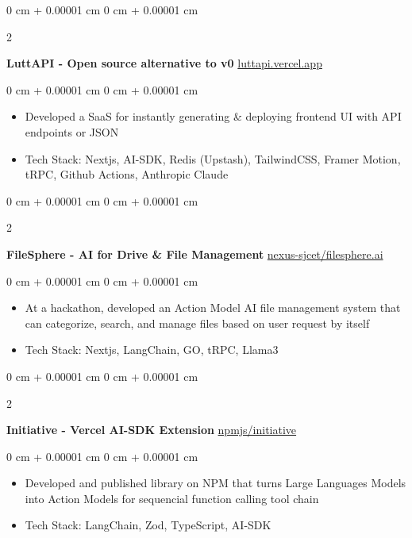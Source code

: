 \documentclass[10pt, letterpaper]{article}
\newenvironment{highlights}{
    \begin{itemize}[
        topsep=0.10 cm,
        parsep=0.10 cm,
        partopsep=0pt,
        itemsep=0pt,
        leftmargin=0 cm + 10pt
    ]
}{
    \end{itemize}
} %
\newenvironment{onecolentry}{
    \begin{adjustwidth}{
        0 cm + 0.00001 cm
    }{
        0 cm + 0.00001 cm
    }
}{
    \end{adjustwidth}
} %
\newenvironment{twocolentry}[2][]{
    \onecolentry
    \def\secondColumn{#2}
    \setcolumnwidth{\fill, 4.5 cm}
    \begin{paracol}{2}
}{
    \switchcolumn \raggedleft \secondColumn
    \end{paracol}
    \endonecolentry
} %
\begin{document}
\vspace{0.2 cm}

\begin{twocolentry}{
		\href{https://luttapi.vercel.app/}{luttapi.vercel.app}
	}
	\textbf{LuttAPI - Open source alternative to v0}\end{twocolentry}

\vspace{0.10 cm}
\begin{onecolentry}
	\begin{highlights}
		\item Developed a SaaS for instantly generating \& deploying frontend UI with API
		endpoints or JSON
		\item Tech Stack: Nextjs, AI-SDK, Redis (Upstash), TailwindCSS, Framer Motion, tRPC,
		Github Actions, Anthropic Claude
	\end{highlights}
\end{onecolentry}

\vspace{0.2 cm}

\begin{twocolentry}{
		\href{https://github.com/nexus-sjcet/filesphere.ai}{nexus-sjcet/filesphere.ai}
	}
	\textbf{FileSphere - AI for Drive \& File Management}\end{twocolentry}

\vspace{0.10 cm}
\begin{onecolentry}
	\begin{highlights}
		\item At a hackathon, developed an Action Model AI file management system that can
		categorize, search, and manage files based on user request by itself
		\item Tech Stack: Nextjs, LangChain, GO, tRPC, Llama3
	\end{highlights}
\end{onecolentry}
\vspace{0.2 cm}

\begin{twocolentry}{
		\href{https://www.npmjs.com/package/initiative}{npmjs/initiative}
	}
	\textbf{Initiative - Vercel AI-SDK Extension}\end{twocolentry}

\vspace{0.10 cm}
\begin{onecolentry}
	\begin{highlights}
		\item Developed and published library on NPM that turns Large Languages Models into
		Action Models for sequencial function calling tool chain
		\item Tech Stack: LangChain, Zod, TypeScript, AI-SDK
	\end{highlights}
\end{onecolentry}
\vspace{0.2 cm}
\end{document}
